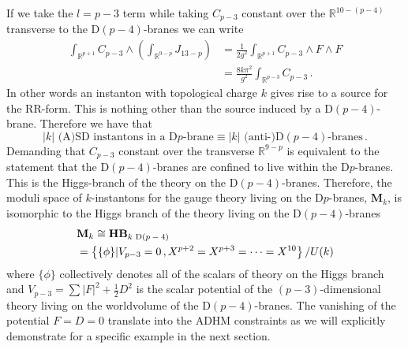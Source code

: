 \documentclass[main.tex]{subfiles}
\begin{document}
If we take the $l=p-3$ term while taking $C_{p-3}$ constant over the $\mathbb{R}^{10-(p-4)}$ transverse to the D$(p-4)$-branes we can write
\begin{equation}
\begin{aligned}
\int_{\mathbb{R}^{p+1}} C_{p-3}\wedge\left(\int_{\mathbb{R}^{9-p}}J_{13-p}\right)&=\frac{1}{2g^2}\int_{\mathbb{R}^{p+1}} C_{p-3}\wedge F\wedge F\\
&=\frac{8k\pi^2}{g^2}\int_{\mathbb{R}^{p-3}}C_{p-3}\,.
\end{aligned}
\end{equation}
In other words an instanton with topological charge $k$ gives rise to a source for the RR-form.  This is nothing other than the source induced by a D$(p-4)$-brane.  Therefore we have that
\begin{equation}
\text{$|k|$ (A)SD instantons in a D$p$-brane}\equiv\text{$|k|$ (anti-)D$(p-4)$-branes}\,.
\end{equation}
Demanding that $C_{p-3}$ constant over the transverse $\mathbb{R}^{9-p}$ is equivalent to the statement that the D$(p-4)$-branes are confined to live within the D$p$-branes.  This is the Higgs-branch of the theory on the D$(p-4)$-branes.  Therefore, the moduli space of $k$-instantons for the gauge theory living on the D$p$-branes, $\mathbf{M}_{k}$, is isomorphic to the Higgs branch of the theory living on the D$(p-4)$-branes
\begin{align}
&\mathbf{M}_{k}\cong \mathbf{HB}_{\text{$k$ D$(p-4)$}}\\
&=\left\{\{\phi\}|V_{p-3}=0\,,X^{p+2}=X^{p+3}=\dots=X^{10}\right\}/U(k)
\end{align}
where $\{\phi\}$ collectively denotes all of the scalars of theory on the Higgs branch and $V_{p-3}=\sum |F|^2+ {\frac{1}{2}}D^2$ is the scalar potential of the $(p-3)$-dimensional theory living on the worldvolume of the D$(p-4)$-branes.  The vanishing of the potential $F=D=0$ translate into the ADHM constraints \cite{Dorey:2000zq,Dorey:2002ik} as we will explicitly demonstrate for a specific example in the next section.
\end{document}
